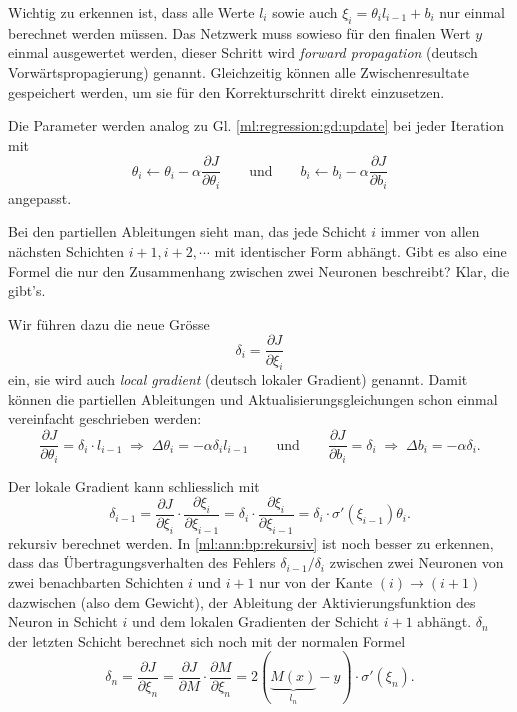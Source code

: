 Wichtig zu erkennen ist, dass alle Werte $l_i$ sowie auch $\xi_i=\theta_i l_{i-1}+b_i$ nur
einmal berechnet werden müssen. Das Netzwerk muss sowieso für den finalen Wert $y$ einmal
ausgewertet werden, dieser Schritt wird \emph{forward propagation} (deutsch Vorwärtspropagierung)
genannt. Gleichzeitig können alle Zwischenresultate gespeichert werden, um sie für den
Korrekturschritt direkt einzusetzen.

Die Parameter werden analog zu Gl. \eqref{ml:regression:gd:update} bei jeder Iteration mit
\begin{equation}
    \theta_i \leftarrow \theta_i - \alpha \frac{\partial J}{\partial \theta_i}
    \qquad\text{und}\qquad
    b_i \leftarrow b_i - \alpha \frac{\partial J}{\partial b_i}
\end{equation}
angepasst.

Bei den partiellen Ableitungen sieht man, das jede Schicht $i$ immer von allen
nächsten Schichten $i+1, i+2, \cdots$ mit identischer Form abhängt. Gibt es also eine Formel
die nur den Zusammenhang zwischen zwei Neuronen beschreibt? Klar, die gibt's.

Wir führen dazu die neue Grösse 
\begin{equation}
    \delta_i = \frac{\partial J}{\partial \xi_i}
\end{equation}
ein, sie wird auch \emph{local gradient} (deutsch lokaler Gradient) genannt. Damit können
die partiellen Ableitungen und Aktualisierungsgleichungen schon einmal vereinfacht geschrieben werden:
\begin{equation}
    \frac{\partial J}{\partial \theta_i} = \delta_i \cdot l_{i-1}
    \;\Rightarrow\; \Delta \theta_i = - \alpha \delta_i l_{i-1}
    \qquad\text{und}\qquad
    \frac{\partial J}{\partial b_i} = \delta_i
    \; \Rightarrow\; \Delta b_i = - \alpha \delta_i.
\end{equation}

Der lokale Gradient kann schliesslich mit
\begin{equation}
    \delta_{i-1} = \frac{\partial J}{\partial \xi_i} \cdot \frac{\partial \xi_i}{\partial \xi_{i-1}}
    = \delta_i \cdot \frac{\partial \xi_i}{\partial \xi_{i-1}}
    = \delta_i \cdot \sigma'(\xi_{i-1}) \theta_i
    \label{ml:ann:bp:rekursiv}.
\end{equation}
rekursiv berechnet werden. In \eqref{ml:ann:bp:rekursiv} ist noch besser zu erkennen, dass das Übertragungsverhalten
des Fehlers $\delta_{i-1}/\delta_i$
zwischen zwei Neuronen von zwei benachbarten Schichten $i$ und $i+1$ nur von der Kante
$(i)\rightarrow(i+1)$ dazwischen (also dem
Gewicht), der Ableitung der Aktivierungsfunktion des Neuron in Schicht $i$ und dem lokalen
Gradienten der Schicht $i+1$ abhängt.
$\delta_n$ der letzten Schicht berechnet sich noch mit der normalen Formel
\begin{equation}
    \delta_n = \frac{\partial J}{\partial \xi_n}
    = \frac{\partial J}{\partial M} \cdot \frac{\partial M}{\partial \xi_n}
    = 2(\underbrace{M(x)}_{l_n} - y) \cdot \sigma'(\xi_n).
\end{equation}

